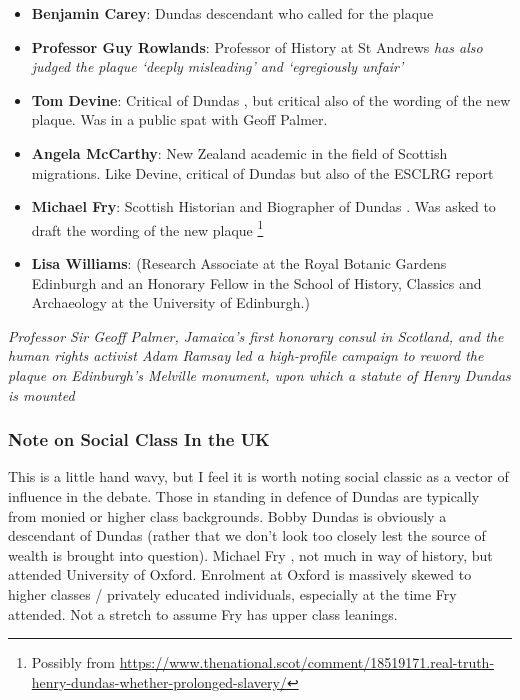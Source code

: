 \documentclass{scrartcl}
\begin{document}
\begin{itemize}
\begin{itemize}
\begin{itemize}
        \end{itemize}
    \end{itemize}
    \item \textbf{Benjamin Carey}: Dundas descendant who called for the plaque
    \item \textbf{Professor Guy Rowlands}:  Professor of History at St Andrews \textit{has also judged the plaque ‘deeply misleading’ and ‘egregiously unfair’}  \cite{mccarthy_2022, rowlands_2021}
    \item \textbf{Tom Devine}: Critical of Dundas \cite{devine_2015}, but critical also of the wording of the new plaque. Was in a public spat with Geoff Palmer.
    \item \textbf{Angela McCarthy}: New Zealand academic in the field of Scottish migrations. Like Devine, critical of Dundas but also of the ESCLRG report \cite{esclr_2022}
\item \textbf{Michael Fry}: Scottish Historian and Biographer of Dundas \cite{fry_1992}. Was asked to draft the wording of the new plaque \cite{mccarthy_2022}\footnote{Possibly from \url{https://www.thenational.scot/comment/18519171.real-truth-henry-dundas-whether-prolonged-slavery/}}
\item \textbf{Lisa Williams}: (Research Associate at the Royal Botanic Gardens Edinburgh and an Honorary Fellow in the School of History, Classics and Archaeology at the University of Edinburgh.)

\end{itemize}

\textit{Professor Sir Geoff Palmer, Jamaica’s first honorary consul in Scotland, and the human rights activist Adam Ramsay led a high-profile campaign to reword the plaque on Edinburgh’s Melville monument, upon which a statute of Henry Dundas is mounted}\cite{mullen_2022}

\subsubsection{Note on Social Class In the UK}

This is a little hand wavy, but I feel it is worth noting social classic as a vector of influence in the debate. Those in standing in defence of Dundas are typically from monied or higher class backgrounds. Bobby Dundas is obviously a descendant of Dundas (rather that we don't look too closely lest the source of wealth is brought into question). Michael Fry , not much in way of history, but attended University of Oxford. Enrolment at Oxford is massively skewed to higher classes / privately educated individuals, especially at the time Fry attended. Not a stretch to assume Fry has upper class leanings.    
\end{document}
